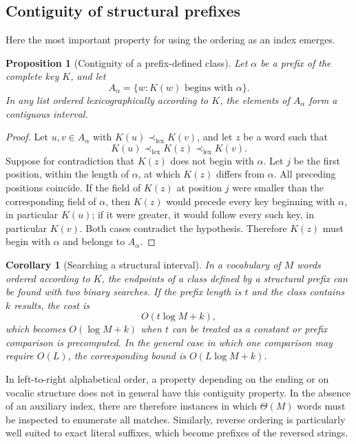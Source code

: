 \documentclass[11pt,a4paper]{article}
\newtheorem{proposition}[theorem]{Proposition}
\newtheorem{corollary}[theorem]{Corollary}
\theoremstyle{definition}
\theoremstyle{remark}
\newcommand{\lexord}{\prec_{\mathrm{lex}}}
\begin{document}
\subsection{Contiguity of structural prefixes}

Here the most important property for using the ordering as an index emerges.

\begin{proposition}[Contiguity of a prefix-defined class]
Let $\alpha$ be a prefix of the complete key $K$, and let
\[
  A_{\alpha}=\{w:K(w)\text{ begins with }\alpha\}.
\]
In any list ordered lexicographically according to $K$, the elements of $A_{\alpha}$ form a contiguous interval.
\end{proposition}

\begin{proof}
Let $u,v\in A_{\alpha}$ with $K(u)\lexord K(v)$, and let $z$ be a word such that
\[
  K(u)\lexord K(z)\lexord K(v).
\]
Suppose for contradiction that $K(z)$ does not begin with $\alpha$. Let $j$ be the first position, within the length of $\alpha$, at which $K(z)$ differs from $\alpha$. All preceding positions coincide. If the field of $K(z)$ at position $j$ were smaller than the corresponding field of $\alpha$, then $K(z)$ would precede every key beginning with $\alpha$, in particular $K(u)$; if it were greater, it would follow every such key, in particular $K(v)$. Both cases contradict the hypothesis. Therefore $K(z)$ must begin with $\alpha$ and belongs to $A_{\alpha}$.
\end{proof}

\begin{corollary}[Searching a structural interval]
In a vocabulary of $M$ words ordered according to $K$, the endpoints of a class defined by a structural prefix can be found with two binary searches. If the prefix length is $t$ and the class contains $k$ results, the cost is
\[
  O(t\log M+k),
\]
which becomes $O(\log M+k)$ when $t$ can be treated as a constant or prefix comparison is precomputed. In the general case in which one comparison may require $O(L)$, the corresponding bound is $O(L\log M+k)$.
\end{corollary}

In left-to-right alphabetical order, a property depending on the ending or on vocalic structure does not in general have this contiguity property. In the absence of an auxiliary index, there are therefore instances in which $\Theta(M)$ words must be inspected to enumerate all matches. Similarly, reverse ordering is particularly well suited to exact literal suffixes, which become prefixes of the reversed strings.
\end{document}

